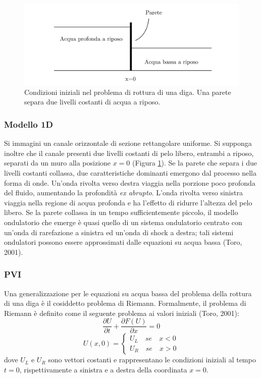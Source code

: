 \documentclass[12pt]{article} %
\begin{document}
\begin{figure} [H]
    \centering
    \includegraphics[width=0.6\columnwidth]{Dam Break.png}
    \caption{Condizioni iniziali nel problema di rottura di una diga. Una parete separa due livelli costanti di acqua a riposo.}
    \label{fig:Dam Break}
\end{figure}

\subsubsection{Modello 1D}
\noindent Si immagini un canale orizzontale di sezione rettangolare uniforme. Si supponga inoltre che il canale presenti due livelli costanti di pelo libero, entrambi a riposo, separati da un muro alla posizione $x=0$ (Figura \ref{fig:Dam Break}).
\noindent Se la parete che separa i due livelli costanti collassa, due caratteristiche dominanti emergono dal processo nella forma di onde. Un'onda rivolta verso destra viaggia nella porzione poco profonda del fluido, aumentando la profondità \textit{ex abrupto}. L'onda rivolta verso sinistra viaggia nella regione di acqua profonda e ha l'effetto di ridurre l'altezza del pelo libero. Se la parete collassa in un tempo sufficientemente piccolo, il modello ondulatorio che emerge è quasi quello di un sistema ondulatorio centrato con un'onda di rarefazione a sinistra ed un'onda di shock a destra; tali sistemi ondulatori possono essere approssimati dalle equazioni su acqua bassa (Toro, 2001).
\subsubsection{PVI}
\noindent Una generalizzazione per le equazioni su acqua bassa del problema della rottura di una diga è il cosiddetto problema di Riemann. Formalmente, il problema di Riemann è definito come il seguente problema ai valori iniziali (Toro, 2001):
\begin{equation}
    \frac{\partial U}{\partial t}+\frac{\partial F(U)}{\partial x}=0
    \label{eqn:Riemann}
\end{equation}
\begin{equation}
    U(x,0)=\begin{cases}U_L\quad se\quad x<0\\
    U_R\quad se\quad x>0
    \end{cases}
    \label{eqn:Riemann_cond_iniziali}
\end{equation}
\noindent dove $U_L$ e $U_R$ sono vettori costanti e rappresentano le condizioni iniziali al tempo $t=0$, rispettivamente a sinistra e a destra della coordinata $x=0$.
\newpage
\end{document}
